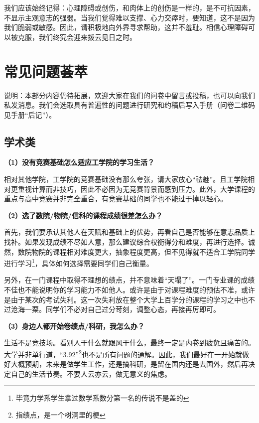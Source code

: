 \documentclass[11pt,oneside]{book}
\begin{document}
\vspace{10pt}

我们应该始终记得：心理障碍或创伤，和肉体上的创伤是一样的，是不可抗因素，不显示主观意志的强弱。当我们觉得难以支撑、心力交瘁时，要知道，这不是因为我们脆弱或敏感。因此，请积极地向外界寻求帮助，这并不羞耻。相信心理障碍可以被克服，我们终究会迎来拨云见日之时。

\section{常见问题荟萃}

说明：本部分内容仍待拓展，欢迎大家在我们的问卷中留言或投稿，也可以向我们私发消息。我们会选取具有普遍性的问题进行研究和约稿后写入手册（问卷二维码见手册“后记”）。

\subsection{学术类}
\textbf{（1）没有竞赛基础怎么适应工学院的学习生活？}

相对其他学院，工学院的竞赛基础没有那么夸张，请大家放心“祛魅”。且工学院相对更重视计算而非技巧，因此不必因为无竞赛背景而感到压力。此外，大学课程的重点与高中竞赛并非完全重合，有竞赛基础的同学也不能过于掉以轻心。

\vspace{10pt}

\textbf{（2）选了数院/物院/信科的课程成绩很差怎么办？}

首先，我们要承认其他人在天赋和基础上的优势，再看自己是否能够在意志品质上找补。如果发现成绩不尽如人意，那么建议综合权衡得分和难度，再进行选择。诚然，数院物院的课程相对难度更大，抽象程度更高，但不见得就不适合工学院同学进行学习\footnote{毕竟力学系学生拿过数学系数分第一名的传说不是盖的}，具体如何选择需要同学们自己衡量。

\vspace{10pt}

另外，在一门课程中取得不理想的绩点，并不意味着“天塌了”。一门专业课的成绩不佳也不能说明你的学习能力不如他人。或许是由于对课程难度的预估不准，或许是由于某次的考试失利。这一次失利放在整个大学上百学分的课程的学习之中也不过沧海一粟。同学们不必对自己过分苛刻，调整心态，再接再厉即可。

\vspace{10pt}

\textbf{（3）身边人都开始卷绩点/科研，我怎么办？}

生活不是竞技场。看别人干什么就跟风干什么，最终一定是内卷到疲惫且痛苦的。大学并非单行道，“3.92”\footnote{指绩点，是一个树洞里的梗}也不是所有问题的通解。因此，我们最好在一开始就做好大概预期，未来是做学生工作，还是搞科研，是留在国内还是去国外，然后再决定自己的生活节奏。不要人云亦云，做无意义的焦虑。
\end{document}
